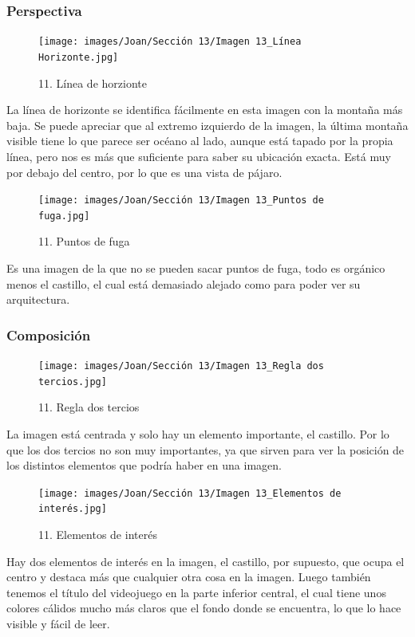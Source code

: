 \documentclass[12pt]{article}
\begin{document}
            \subsubsection{Perspectiva}
            \begin{figure}[H]
          \centering
          \texttt{[image: images/Joan/Sección 13/Imagen 13\_Línea Horizonte.jpg]}
          \caption{\small 11. Línea de horzionte}
        \end{figure}
        La línea de horizonte se identifica fácilmente en esta imagen con la montaña más baja. Se puede apreciar que al extremo izquierdo de la imagen, la última montaña visible tiene lo que parece ser océano al lado, aunque está tapado por la propia línea, pero nos es más que suficiente para saber su ubicación exacta. Está muy por debajo del centro, por lo que es una vista de pájaro. 

        \begin{figure}[H]
          \centering
          \texttt{[image: images/Joan/Sección 13/Imagen 13\_Puntos de fuga.jpg]}
          \caption{\small 11. Puntos de fuga}
        \end{figure}
        Es una imagen de la que no se pueden sacar puntos de fuga, todo es orgánico menos el castillo, el cual está demasiado alejado como para poder ver su arquitectura. 

            \subsubsection{Composición}
            \begin{figure}[H]
          \centering
          \texttt{[image: images/Joan/Sección 13/Imagen 13\_Regla dos tercios.jpg]}
          \caption{\small 11. Regla dos tercios}
        \end{figure}
        La imagen está centrada y solo hay un elemento importante, el castillo. Por lo que los dos tercios no son muy importantes, ya que sirven para ver la posición de los distintos elementos que podría haber en una imagen. 

        \begin{figure}[H]
          \centering
          \texttt{[image: images/Joan/Sección 13/Imagen 13\_Elementos de interés.jpg]}
          \caption{\small 11. Elementos de interés}
        \end{figure}
        Hay dos elementos de interés en la imagen, el castillo, por supuesto, que ocupa el centro y destaca más que cualquier otra cosa en la imagen. Luego también tenemos el título del videojuego en la parte inferior central, el cual tiene unos colores cálidos mucho más claros que el fondo donde se encuentra, lo que lo hace visible y fácil de leer. 
\end{document}
